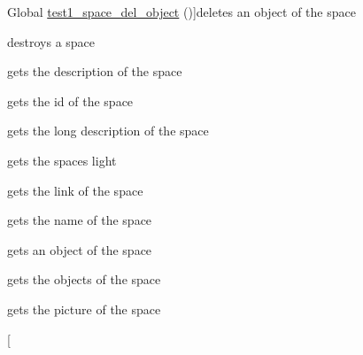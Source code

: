 \begin{DoxyRefList}
%
Global \hyperlink{space__tb_8c_a871c964198bb9b8e085e4762654fdca1}{test1\+\_\+space\+\_\+del\+\_\+object} ()]deletes an object of the space  
\item[\label{test__test000041}%
\Hypertarget{test__test000041}%
Global \hyperlink{space__tb_8c_af3febdc46ce54799ebfcdbc4330ee93e}{test1\+\_\+space\+\_\+destroy} ()]destroys a space  
\item[\label{test__test000047}%
\Hypertarget{test__test000047}%
Global \hyperlink{space__tb_8c_a27f4cd22643b419fcee714a000a37e5c}{test1\+\_\+space\+\_\+get\+\_\+descrp} ()]gets the description of the space  
\item[\label{test__test000043}%
\Hypertarget{test__test000043}%
Global \hyperlink{space__tb_8c_a920df9e02482f4f1e6a5ebcaec523860}{test1\+\_\+space\+\_\+get\+\_\+id} ()]gets the id of the space  
\item[\label{test__test000049}%
\Hypertarget{test__test000049}%
Global \hyperlink{space__tb_8c_a2834bbc0223d0dfa0de3357024f1f9e3}{test1\+\_\+space\+\_\+get\+\_\+ldescrp} ()]gets the long description of the space  
\item[\label{test__test000079}%
\Hypertarget{test__test000079}%
Global \hyperlink{space__tb_8c_a689bc76416100ff3ca24991cacb6deb8}{test1\+\_\+space\+\_\+get\+\_\+light} ()]gets the space\textquotesingle{}s light  
\item[\label{test__test000059}%
\Hypertarget{test__test000059}%
Global \hyperlink{space__tb_8c_abff681ffd4e5ea1f6177503f251ab49d}{test1\+\_\+space\+\_\+get\+\_\+link} ()]gets the link of the space  
\item[\label{test__test000057}%
\Hypertarget{test__test000057}%
Global \hyperlink{space__tb_8c_ad12c42523c517507566c5c68b1527689}{test1\+\_\+space\+\_\+get\+\_\+name} ()]gets the name of the space  
\item[\label{test__test000067}%
\Hypertarget{test__test000067}%
Global \hyperlink{space__tb_8c_a4a1ca89fa511c04bb07c14edb19c17ba}{test1\+\_\+space\+\_\+get\+\_\+object} ()]gets an object of the space  
\item[\label{test__test000051}%
\Hypertarget{test__test000051}%
Global \hyperlink{space__tb_8c_a30ccffb300d95f8db99bf7a5f1d57352}{test1\+\_\+space\+\_\+get\+\_\+objects} ()]gets the objects of the space  
\item[\label{test__test000073}%
\Hypertarget{test__test000073}%
Global \hyperlink{space__tb_8c_afd2b3998bc0227192d674dd996cac3e9}{test1\+\_\+space\+\_\+get\+\_\+picture} ()]gets the picture of the space  
\item[\label{test__test000069}%

\end{DoxyRefList}
